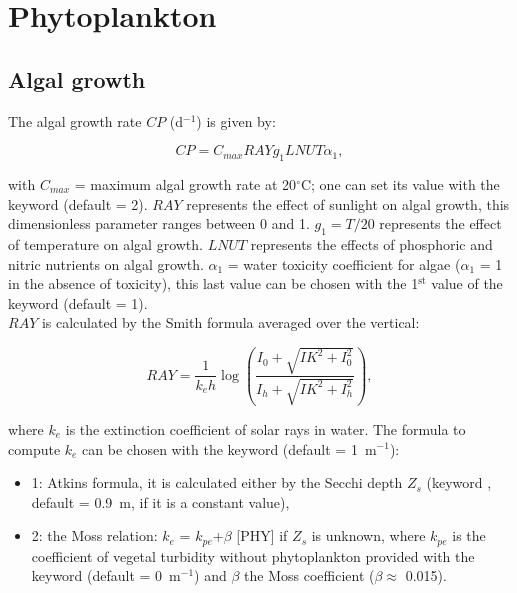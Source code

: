 \section{Phytoplankton}

\subsection{Algal growth}

The algal growth rate $CP$ (d$^{-1}$) is given by:

\begin{equation*}
  CP = C_{max} RAY g_1 LNUT \alpha_1,
\end{equation*}

with $C_{max}$ = maximum algal growth rate at 20$^{\circ}$C;
one can set its value with the keyword  (default = 2).
$RAY$ represents the effect of sunlight on algal growth,
this dimensionless parameter ranges between 0 and 1.
$g_1 = T/20$ represents the effect of temperature on algal growth.
$LNUT$ represents the effects of phosphoric and nitric nutrients on algal growth.
$\alpha_1$ = water toxicity coefficient for algae ($\alpha_1$ = 1 in the absence of toxicity),
this last value can be chosen with the 1$^{\textrm{st}}$ value of the keyword
 (default = 1).\\
$RAY$ is calculated by the Smith formula averaged over the vertical:

\begin{equation*}
  RAY = \frac{1}{k_e h} \log \left( \frac{I_0 + \sqrt{IK^2+I_0^2} }{ I_h + \sqrt{IK^2+I_h^2} }  \right),
\end{equation*}

where $k_e$ is the extinction coefficient of solar rays in water.
The formula to compute $k_e$ can be chosen with the keyword
 (default = 1~m$^{-1}$):
\begin{itemize}
  \item 1: Atkins formula, it is calculated either by the Secchi depth $Z_s$
(keyword , default = 0.9~m, if it is a constant value),
  \item 2: the Moss relation: $k_e$ = $k_{pe}$+$ \beta $ [PHY] if $Z_s$ is unknown,
    where $k_{pe}$ is the coefficient of vegetal turbidity without phytoplankton
    provided with the keyword 
    (default = 0~m$^{-1}$)
    and $\beta$ the Moss coefficient ($\beta \approx$ 0.015).
\end{itemize}

